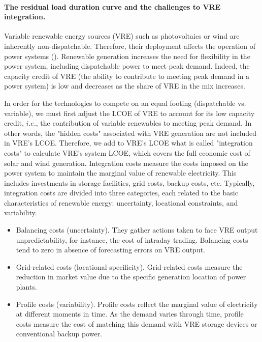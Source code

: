 \paragraph{The residual load duration curve and the challenges to VRE integration.}

Variable renewable energy sources (VRE) such as photovoltaics or wind are inherently non-dispatchable. Therefore, their deployment affects the operation of power systems (\cite{Hirth2015}). Renewable generation increases the need for flexibility in the power system, including dispatchable power to meet peak demand. Indeed, the capacity credit of VRE (the ability to contribute to meeting peak demand in a power system) is low and decreases as the share of VRE in the mix increases.

In order for the technologies to compete on an equal footing (dispatchable vs. variable), we must first adjust the LCOE of VRE to account for its low capacity credit, $i.e.$, the contribution of variable renewables to meeting peak demand. In other words, the "hidden costs" associated with VRE generation are not included in VRE's LCOE. Therefore, we add to VRE's LCOE what is called "integration costs" to calculate VRE's system LCOE, which covers the full economic cost of solar and wind generation. Integration costs measure the costs imposed on the power system to maintain the marginal value of renewable electricity. This includes investments in storage facilities, grid costs, backup costs, etc. Typically, integration costs are divided into three categories, each related to the basic characteristics of renewable energy: uncertainty, locational constraints, and variability.
\begin{itemize}
    \item Balancing costs (uncertainty). They gather actions taken to face VRE output unpredictability, for instance, the cost of intraday trading. Balancing costs tend to zero in absence of forecasting errors on VRE output.
    \item Grid-related costs (locational specificity). Grid-related costs measure the reduction in market value due to the specific generation location of power plants.
    \item Profile costs (variability). Profile costs reflect the marginal value of electricity at different moments in time. As the demand varies through time, profile costs measure the cost of matching this demand with VRE storage devices or conventional backup power.
\end{itemize}

